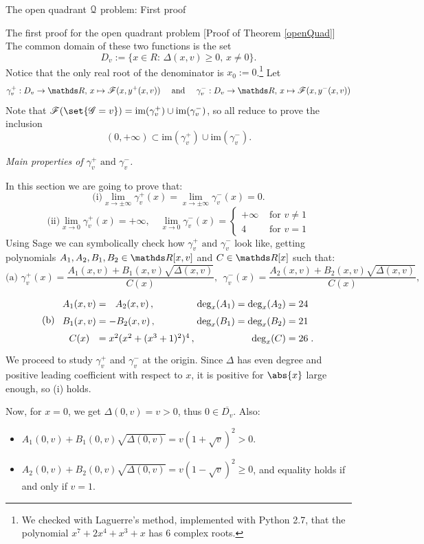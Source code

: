\documentclass[11pt, a4paper, english, twoside, notitlepage, openright]{report}
\begin{document}
\begin{chapter}{The open quadrant $\mathcal{Q}$ problem: First proof}
\begin{section}{The first proof for the open quadrant problem} [Proof of Theorem \ref{openQuad}]
The common domain of these two functions is the set 
$$
D_v:=\{x\in R:\, \Delta(x,v)\geq 0,\,x\neq 0\}.
$$ 
Notice that the only real root of the denominator is $x_0:=0$.\footnote{We checked with Laguerre's method, implemented with Python 2.7, that the polynomial $x^7+2x^4+x^3+x$ has 6 complex roots.} Let
$$
\gamma_v^+: D_v\to\R,\, x\mapsto\F(x,y^+(x,v))\quad\text{ and }\quad\gamma_v^-:D_v\to\R,\, x\mapsto\F(x,y^-(x,v))
$$
Note that $\F(\set{\G=v})=\text{im}(\gamma_v^+)\cup\text{im}(\gamma_v^-)$, so all reduce to prove the inclusion 
$$
(0,+\infty)\subset\text{im}(\gamma_v^+)\cup\text{im}(\gamma_v^-).
$$
\begin{center}
 \emph{Main properties of $\gamma_v^+ \text{ and } \gamma_v^-$.}
\end{center}\label{step2}
In this section we are going to prove that:
$$
\text{(i)} \lim_{x\rightarrow \pm\infty}\gamma_v^+(x)=\lim_{x\rightarrow \pm\infty}\gamma_v^-(x)=0.
$$
$$\text{(ii)} \lim_{x\rightarrow 0}\gamma_v^+(x)=+\infty
,\quad \lim_{x\rightarrow 0}\gamma_v^-(x)=\left\{\begin{array}{ll}
+\infty&\text{ for $v\neq 1$}\\
 4 & \text{ for $v=1$}
\end{array} \right.
$$
Using Sage we can symbolically check how $\gamma_v^+\text{ and }\gamma_v^-$ look like, getting polynomials $A_1,A_2,B_1,B_2\in\R[x,v]$ and $C\in \R[x]$ such that:
$$\text{(a) }\gamma_v^+(x)=\dfrac{A_1(x,v)+B_1(x,v)\sqrt{\Delta(x,v)}}{C(x)}, \ \ 
\gamma_v^-(x)=\dfrac{A_2(x,v)+B_2(x,v)\sqrt{\Delta(x,v)}}{C(x)},$$
$$
\text{(b)}\ \ 
\arraycolsep=1.4pt\def\arraystretch{1.5}
\begin{array}{cclrl}
A_1(x,v)&=&\ \ A_2(x,v)\, , & \text{deg}_x(A_1)=\text{deg}_x(A_2)=24& \\
B_1(x,v)&=&-B_2(x,v)\, , &\text{deg}_x(B_1)=\text{deg}_x(B_2)=21& \\
C(x)&=&x^2(x^2+(x^3+1)^2)^4\, , & \text{deg}_x(C)=26&.
\end{array}
$$
We proceed to study $\gamma_v^+$ and $\gamma_v^-$ at the origin. Since $\Delta$ has even degree and positive leading coefficient with respect to $x$, it is positive for $\abs{x}$ large enough, so (i) holds.
			
Now, for $x=0$, we get $\Delta(0,v)=v>0$, thus $0\in\overline{D_v}$. Also:
\begin{itemize}
\item $A_1(0,v)+B_1(0,v) \sqrt{\Delta(0,v)}= v(1+\sqrt{v})^2>0$.
				\item $A_2(0,v)+B_2(0,v)\sqrt{\Delta(0,v)}=v(1-\sqrt{v})^2\geq 0$, and equality holds if and only if $v=1$.
\end{itemize}
			

\end{section}
\end{chapter}
\end{document}
